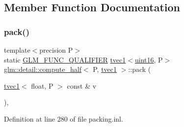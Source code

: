\subsection{Member Function Documentation}
\mbox{\label{structglm_1_1detail_1_1compute__half_3_01_p_00_01tvec1_01_4_a9a68b199364fc66de210ca1de0d2242b}} 
\subsubsection{\texorpdfstring{pack()}{pack()}}
{\footnotesize\ttfamily template$<$precision P$>$ \\
static \mbox{\hyperlink{setup_8hpp_a33fdea6f91c5f834105f7415e2a64407}{G\+L\+M\+\_\+\+F\+U\+N\+C\+\_\+\+Q\+U\+A\+L\+I\+F\+I\+ER}} \mbox{\hyperlink{structglm_1_1tvec1}{tvec1}}$<$\mbox{\hyperlink{namespaceglm_1_1detail_a47b2a7d006d187338e8031a352d1ce56}{uint16}}, P$>$ \mbox{\hyperlink{structglm_1_1detail_1_1compute__half}{glm\+::detail\+::compute\+\_\+half}}$<$ P, \mbox{\hyperlink{structglm_1_1tvec1}{tvec1}} $>$\+::pack (\begin{DoxyParamCaption}\item[{\mbox{\hyperlink{structglm_1_1tvec1}{tvec1}}$<$ float, P $>$ const \&}]{v }\end{DoxyParamCaption})\hspace{0.3cm}{\ttfamily [inline]}, {\ttfamily [static]}}



Definition at line 280 of file packing.\+inl.

\mbox{\label{structglm_1_1detail_1_1compute__half_3_01_p_00_01tvec1_01_4_a92e6b667d1d28ae167b9df692c805afd}} 
